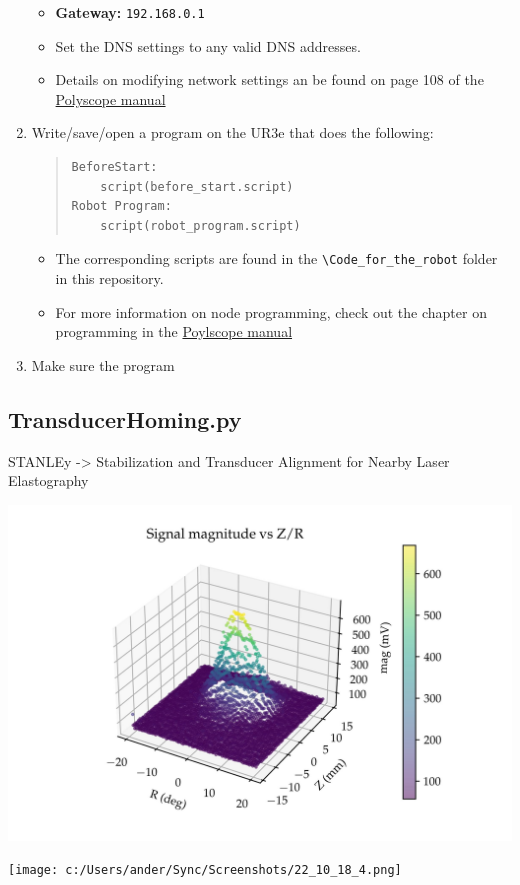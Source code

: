 \documentclass[11pt]{article}
\begin{document}
\begin{enumerate}
\begin{itemize}
        \item \textbf{Gateway:} \texttt{192.168.0.1}
        \item Set the DNS settings to any valid DNS addresses.
        \item Details on modifying network settings an be found on page 108 of the \hyperlink{https://s3-eu-west-1.amazonaws.com/ur-support-site/44018/Software_Manual_en_Global.pdf\#page=108}{Polyscope manual}
    \end{itemize}
    \item Write/save/open a program on the UR3e that does the following:
        \begin{quote}
\begin{verbatim}
BeforeStart:
    script(before_start.script)
Robot Program:
    script(robot_program.script)        
\end{verbatim}
        \end{quote}
    \begin{itemize}
        \item The corresponding scripts are found in the \texttt{\textbackslash{}Code\_for\_the\_robot} folder in this repository.
        \item For more information on node programming, check out the chapter on programming in the \hyperlink{https://s3-eu-west-1.amazonaws.com/ur-support-site/44018/Software_Manual_en_Global.pdf\#page=60}{Poylscope manual} 
    \end{itemize}
    \item Make sure the program 
\end{enumerate}


\subsection{TransducerHoming.py}\label{sec:TransducerHoming}

STANLEy -> Stabilization and Transducer Alignment for Nearby Laser Elastography
\begin{center}
    \includegraphics[width=.9\linewidth]{../Debugging Scripts/figures/2D_fullscan_render_test_10.jpg}
\end{center}

\begin{center}
    \texttt{[image: c:/Users/ander/Sync/Screenshots/22\_10\_18\_4.png]}
\end{center}
\end{document}
